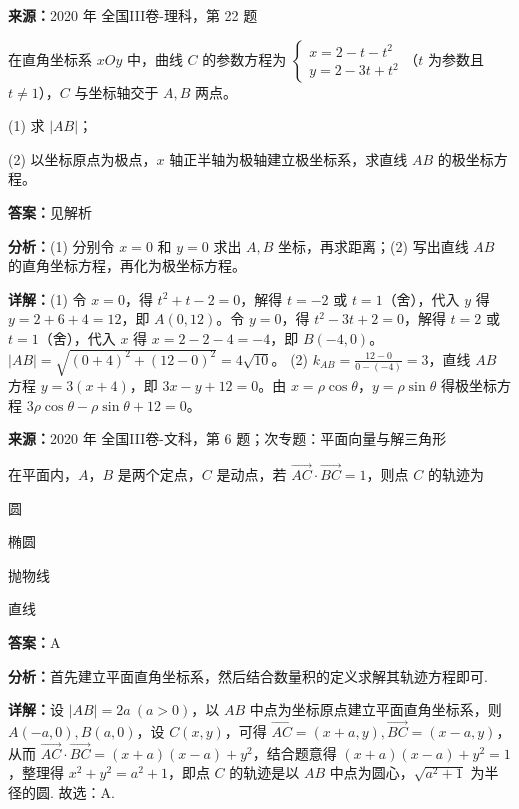 \begin{question}[points=10]
\textbf{来源：}2020 年 全国III卷-理科，第 22 题\par
[选修4-4：坐标系与参数方程]

在直角坐标系 $xOy$ 中，曲线 $C$ 的参数方程为 $\begin{cases} x=2-t-t^2 \\ y=2-3t+t^2 \end{cases}$（$t$ 为参数且 $t\neq1$），$C$ 与坐标轴交于 $A,B$ 两点。

(1) 求 $|AB|$；

(2) 以坐标原点为极点，$x$ 轴正半轴为极轴建立极坐标系，求直线 $AB$ 的极坐标方程。
\begin{solution}
\textbf{答案：}见解析

\textbf{分析：}(1) 分别令 $x=0$ 和 $y=0$ 求出 $A,B$ 坐标，再求距离；(2) 写出直线 $AB$ 的直角坐标方程，再化为极坐标方程。

\textbf{详解：}(1) 令 $x=0$，得 $t^2+t-2=0$，解得 $t=-2$ 或 $t=1$（舍），代入 $y$ 得 $y=2+6+4=12$，即 $A(0,12)$。令 $y=0$，得 $t^2-3t+2=0$，解得 $t=2$ 或 $t=1$（舍），代入 $x$ 得 $x=2-2-4=-4$，即 $B(-4,0)$。$|AB|=\sqrt{(0+4)^2+(12-0)^2}=4\sqrt{10}$。
(2) $k_{AB}=\frac{12-0}{0-(-4)}=3$，直线 $AB$ 方程 $y=3(x+4)$，即 $3x-y+12=0$。由 $x=\rho\cos\theta$，$y=\rho\sin\theta$ 得极坐标方程 $3\rho\cos\theta-\rho\sin\theta+12=0$。
\end{solution}
\end{question}

\begin{question}[points=5]
\textbf{来源：}2020 年 全国III卷-文科，第 6 题；次专题：平面向量与解三角形\par
在平面内，$A$，$B$ 是两个定点，$C$ 是动点，若 $\overrightarrow{AC}\cdot\overrightarrow{BC}=1$，则点 $C$ 的轨迹为
\begin{choices}
  \item 圆
  \item 椭圆
  \item 抛物线
  \item 直线
\end{choices}
\begin{solution}
\textbf{答案：}A

\textbf{分析：}首先建立平面直角坐标系，然后结合数量积的定义求解其轨迹方程即可.

\textbf{详解：}设 $|AB|=2a\ (a>0)$，以 $AB$ 中点为坐标原点建立平面直角坐标系，则 $A(-a,0),B(a,0)$，设 $C(x,y)$，可得 $\overrightarrow{AC}=(x+a,y),\overrightarrow{BC}=(x-a,y)$，从而 $\overrightarrow{AC}\cdot\overrightarrow{BC}=(x+a)(x-a)+y^2$，结合题意得 $(x+a)(x-a)+y^2=1$，整理得 $x^2+y^2=a^2+1$，即点 $C$ 的轨迹是以 $AB$ 中点为圆心，$\sqrt{a^2+1}$ 为半径的圆. 故选：A.
\end{solution}
\end{question}

